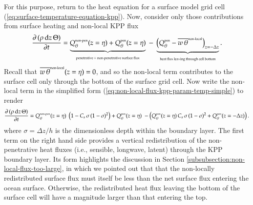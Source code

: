 For this purpose, return to the heat equation for a surface model grid
cell (\ref{eq:surface-temperature-equation-kpp}).  Now, consider only
those contributions from surface heating and non-local KPP flux 
\begin{equation}
 \frac{\partial \, (\rho \, \mathrm{d}z \, \Theta)}{\partial t} 
 =  \underbrace{
  Q_{\theta}^{\mbox{\tiny non-pen}}(z=\eta) +  Q_{\theta}^{\mbox{\tiny pen}}(z=\eta)
  }_{\mbox{\tiny penetrative + non-penetrative surface flux}} 
   \; - \; \underbrace{
    \left( Q_{\theta}^{\mbox{\tiny pen}} -  \overline{w \, \theta}^{\mbox{\tiny non-local}}\right)_{z=-\Delta z}
    }_{\mbox{\tiny heat flux leaving through cell bottom}}. 
 \label{eq:surface-temperature-equation-shortwave-argument-A} 
\end{equation}
Recall that $\overline{w \, \theta}^{\mbox{\tiny non-local}}(z=\eta) =
0$, and so the non-local term contributes to the surface cell only
through the bottom of the surface grid cell.  Now write the non-local
term in the simplified form
(\ref{eq:non-local-flux-kpp-param-temp-simple}) to render
\begin{equation}
 \frac{\partial \, (\rho \, \mathrm{d}z \, \Theta)}{\partial t} 
 =     Q_{\theta}^{\mbox{\tiny non-pen}}(z=\eta) \;     \left( 1 - C_{s} \, \sigma \, (1-\sigma)^{2} \right) 
    +  Q_{\theta}^{\mbox{\tiny pen}}(z=\eta) \;     
    - \left( Q_{\theta}^{\mbox{\tiny pen}}(z=\eta) \, C_{s} \, \sigma \, (1-\sigma)^{2} 
    + Q_{\theta}^{\mbox{\tiny pen}}(z=-\Delta z)  \right). 
 \label{eq:surface-temperature-equation-shortwave-argument-B} 
\end{equation}
where $\sigma = \Delta z / h$ is the dimensionless depth within the
boundary layer.  The first term on the right hand side provides a
vertical redistribution of the non-penetrative heat fluxes (i.e.,
sensible, longwave, latent) through the KPP boundary layer.  Its form
highlights the discussion in Section
\ref{subsubsection:non-local-flux-too-large}, in which we pointed out
that that the non-locally redistributed surface flux must itself be
less than the net surface flux entering the ocean surface.  Otherwise,
the redistributed heat flux leaving the bottom of the surface cell
will have a magnitude larger than that entering the top.

